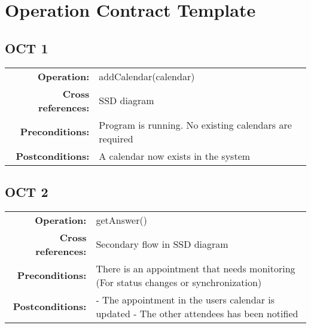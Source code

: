 \section{Operation Contract Template}
  \subsection{OCT 1}
    \begin{table*}[ht]\centering
      \begin{tabularx}{\textwidth}{@{}|rX|@{}}\hline
        \textbf{Operation:}        & addCalendar(calendar) \\
        \textbf{Cross references:} & SSD diagram\\
        \textbf{Preconditions:}    & Program is running. No existing calendars are required \\
        \textbf{Postconditions:}   & A calendar now exists in the system \\\hline
      \end{tabularx}
    \end{table*}
  \subsection{OCT 2}
    \begin{table*}[ht]\centering
      \begin{tabularx}{\textwidth}{@{}|rX|@{}}\hline
        \textbf{Operation:}        & getAnswer()\\
        \textbf{Cross references:} & Secondary flow in SSD diagram \\
        \textbf{Preconditions:}    & There is an appointment that needs monitoring \newline
                                     (For status changes or synchronization)\\
        \textbf{Postconditions:}   & - The appointment in the users calendar is updated \newline 
                                     - The other attendees has been notified \\\hline
      \end{tabularx}
    \end{table*}
\newpage
